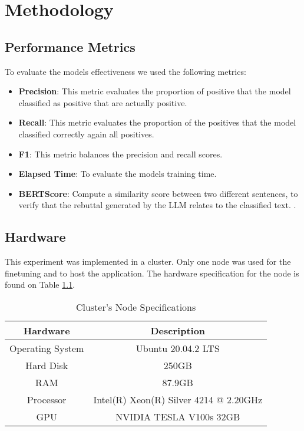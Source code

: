 
\chapter{Methodology}  

\section{Performance Metrics}
To evaluate the models effectiveness we used the following metrics:

\begin{itemize}
	\item{\textbf{Precision}}: This metric evaluates the proportion of positive that the model classified as positive that are actually positive.
	\item{\textbf{Recall}}: This metric evaluates the proportion of the positives that the model classified correctly again all positives.
	\item{\textbf{F1}}: This metric balances the precision and recall scores.
	\item{\textbf{Elapsed Time}}: To evaluate the models training time.
	\item{\textbf{BERTScore}}: Compute a similarity score between two different sentences, to verify that the rebuttal generated by the LLM relates to the classified text. \cite{zhang2020bertscoreevaluatingtextgeneration}.
	
\end{itemize}


\section{Hardware}
This experiment was implemented in a cluster. Only one node was used for the finetuning and to host the application. The hardware specification
for the node is found on Table \ref{table:hardware}.

\begin{table}[ht!]
\centering
\caption{Cluster's Node Specifications}
\begin{tabular}{||c | c||} 
 \hline
\textbf{Hardware} & \textbf{Description} \\ [0.5ex] 
 \hline
 Operating System & Ubuntu 20.04.2 LTS \\ [0.5ex] 
 \hline
 Hard Disk & 250GB  \\ [0.5ex] 
 \hline
 RAM & 87.9GB  \\ [0.5ex] 
 \hline
 Processor & Intel(R) Xeon(R) Silver 4214 @ 2.20GHz \\ [0.5ex] 
 \hline
 GPU & NVIDIA TESLA V100s 32GB \\ [0.5ex] 
 \hline
\end{tabular}
\label{table:hardware}
\end{table}


